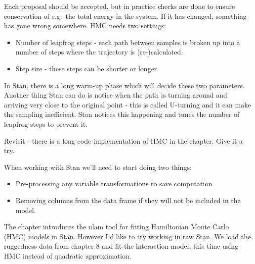 \documentclass[
]{book}
\providecommand{\tightlist}{%
  \setlength{\itemsep}{0pt}\setlength{\parskip}{0pt}}
\begin{document}
Each proposal should be accepted, but in practice checks are done to ensure conservation of e.g.~the total energy in the system. If it has changed, something has gone wrong somewhere. HMC needs two settings:

\begin{itemize}
\tightlist
\item
  Number of leapfrog steps - each path between samples is broken up into a number of steps where the trajectory is (re-)calculated.
\item
  Step size - these steps can be shorter or longer.
\end{itemize}

In Stan, there is a long warm-up phase which will decide these two parameters. Another thing Stan can do is notice when the path is turning around and arriving very close to the original point - this is called U-turning and it can make the sampling inefficient. Stan notices this happening and tunes the number of leapfrog steps to prevent it.

Revisit - there is a long code implementation of HMC in the chapter. Give it a try.

When working with Stan we'll need to start doing two things:

\begin{itemize}
\tightlist
\item
  Pre-processing any variable transformations to save computation
\item
  Removing columns from the data frame if they will not be included in the model.
\end{itemize}

The chapter introduces the ulam tool for fitting Hamiltonian Monte Carlo (HMC) models in Stan. However I'd like to try working in raw Stan. We load the ruggedness data from chapter 8 and fit the interaction model, this time using HMC instead of quadratic approximation.
\end{document}
